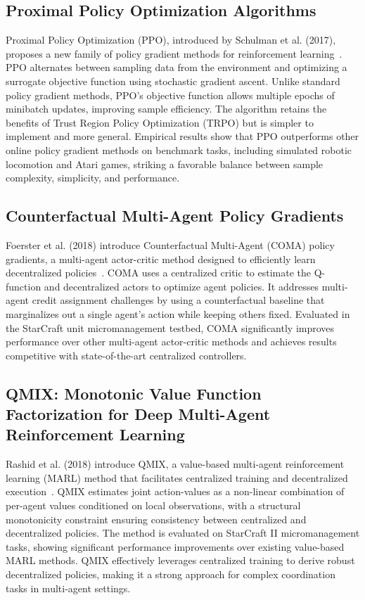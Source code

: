 \documentclass[journal]{IEEEtran}
\begin{document}
\subsection{Proximal Policy Optimization Algorithms} %
Proximal Policy Optimization (PPO), introduced by Schulman et al. (2017), proposes a new family 
of policy gradient methods for reinforcement learning~\cite{schulman2017a}. 
PPO alternates between sampling data from the environment and optimizing a surrogate objective 
function using stochastic gradient ascent. Unlike standard policy gradient methods, PPO's 
objective function allows multiple epochs of minibatch updates, improving sample efficiency. 
The algorithm retains the benefits of Trust Region Policy Optimization (TRPO) but is simpler to 
implement and more general. Empirical results show that PPO outperforms other online policy 
gradient methods on benchmark tasks, including simulated robotic locomotion and Atari games, 
striking a favorable balance between sample complexity, simplicity, and performance.

\subsection{Counterfactual Multi-Agent Policy Gradients} %
Foerster et al. (2018) introduce Counterfactual Multi-Agent (COMA) policy gradients, a multi-agent 
actor-critic method designed to efficiently learn decentralized policies~\cite{foerster2018}. 
COMA uses a centralized critic to estimate the Q-function and decentralized actors to optimize 
agent policies. It addresses multi-agent credit assignment challenges by using a counterfactual 
baseline that marginalizes out a single agent's action while keeping others fixed. 
Evaluated in the StarCraft unit micromanagement testbed, COMA significantly improves 
performance over other multi-agent actor-critic methods and achieves results competitive with 
state-of-the-art centralized controllers.

\subsection{QMIX: Monotonic Value Function Factorization for Deep Multi-Agent 
Reinforcement Learning} %
Rashid et al. (2018) introduce QMIX, a value-based multi-agent reinforcement learning (MARL) 
method that facilitates centralized training and decentralized execution~\cite{rashid2018}. 
QMIX estimates joint action-values as a non-linear combination of per-agent values conditioned on 
local observations, with a structural monotonicity constraint ensuring consistency between 
centralized and decentralized policies. The method is evaluated on StarCraft II micromanagement 
tasks, showing significant performance improvements over existing value-based MARL methods. 
QMIX effectively leverages centralized training to derive robust decentralized policies, 
making it a strong approach for complex coordination tasks in multi-agent settings.
\end{document}
